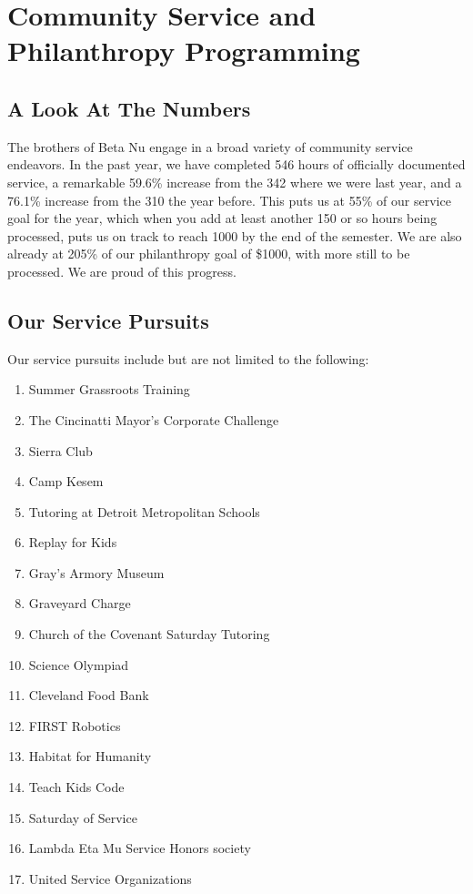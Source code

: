 \chapter{Community Service and Philanthropy Programming}

  \section*{A Look At The Numbers}
    The brothers of Beta Nu engage in a broad variety of community service endeavors. In the past year, we have completed 546 hours of officially documented service, a remarkable  59.6\% increase from the 342 where we were last year, and a 76.1\% increase from the 310 the year before. This puts us at 55\% of our service goal for the year, which when you add at least another 150 or so hours being processed, puts us on track to reach 1000 by the end of the semester. We are also already at 205\% of our philanthropy goal of \$1000, with more still to be processed. We are proud of this progress.
  
    \section*{Our Service Pursuits}
      Our service pursuits include but are not limited to the following:
      
      \begin{enumerate}
      	\item Summer Grassroots Training
      	\item The Cincinatti Mayor's Corporate Challenge
      	\item Sierra Club
      	\item Camp Kesem
      	\item Tutoring at Detroit Metropolitan Schools
      	\item Replay for Kids
      	\item Gray's Armory Museum
      	\item Graveyard Charge
      	\item Church of the Covenant Saturday Tutoring
      	\item Science Olympiad
      	\item Cleveland Food Bank
      	\item FIRST Robotics
      	\item Habitat for Humanity
      	\item Teach Kids Code
      	\item Saturday of Service
      	\item Lambda Eta Mu Service Honors society
      	\item United Service Organizations
      \end{enumerate}
      
